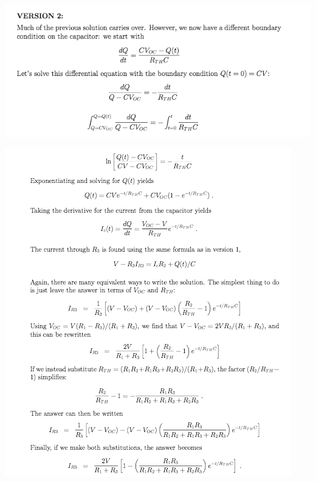 \documentclass{esg8022pset}
\begin{document}
\begin{solution}
  \begin{center}\includegraphics[width=\textwidth]{ps07_sol_07_4}\end{center}
  \begin{center}\includegraphics[width=\textwidth]{ps07_sol_07_5}\end{center}
\end{solution}
\end{document}
